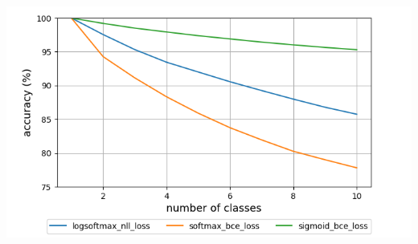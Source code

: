 \documentclass{article}
\begin{document}
\begin{table}[t]
    \mbox{}\hfill
    \begin{minipage}[c]{0.49\textwidth}
    \end{minipage}
    \hfill
    \begin{minipage}[c]{0.49\textwidth}
        \centering
        \includegraphics[scale=0.4,trim={0mm 0mm 0mm 0mm},clip]{mnist.png}
    \end{minipage}
    \hfill
    \mbox{}

    \caption{Accuracy of base model(left) and composed model with respect to number of classes(right)}
    \label{table:mnist_base}
\end{table}
\end{document}
